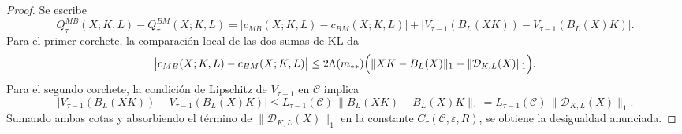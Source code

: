 \documentclass[12pt]{article}
\begin{document}
\begin{proof}
Se escribe
\[
Q_\tau^{MB}(X;K,L)-Q_\tau^{BM}(X;K,L)
=
\bigl[c_{MB}(X;K,L)-c_{BM}(X;K,L)\bigr]
+
\bigl[V_{\tau-1}(B_L(XK))-V_{\tau-1}(B_L(X)K)\bigr].
\]
Para el primer corchete, la comparación local de las dos sumas de KL da
\[
\bigl|c_{MB}(X;K,L)-c_{BM}(X;K,L)\bigr|
\le
2\Lambda(m_{**})\Bigl(\|XK-B_L(X)\|_1+\|\mathcal D_{K,L}(X)\|_1\Bigr).
\]
Para el segundo corchete, la condición de Lipschitz de \(V_{\tau-1}\) en \(\mathcal C\) implica
\[
\bigl|V_{\tau-1}(B_L(XK))-V_{\tau-1}(B_L(X)K)\bigr|
\le
L_{\tau-1}(\mathcal C)\,\|B_L(XK)-B_L(X)K\|_1
=
L_{\tau-1}(\mathcal C)\,\|\mathcal D_{K,L}(X)\|_1.
\]
Sumando ambas cotas y absorbiendo el término de \(\|\mathcal D_{K,L}(X)\|_1\) en la constante \(C_\tau(\mathcal C,\varepsilon,R)\), se obtiene la desigualdad anunciada.
\end{proof}



\end{document}
